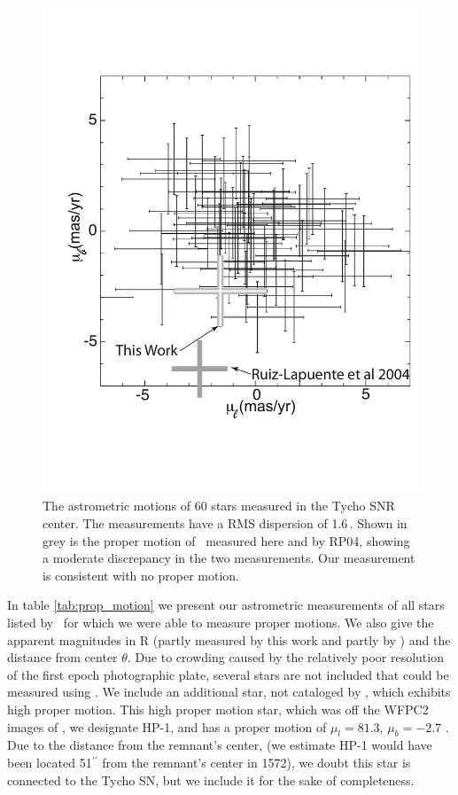 \begin{figure}[h!]
	\centering
	\includegraphics[width=\textwidth]{chapter_sn1572_starg/plots/prop_motion_compare_subaru.pdf}
\caption{The astrometric motions of 60 stars measured in the Tycho SNR
center. The measurements have a RMS dispersion of 1.6\,\masyr. Shown
in grey is the proper motion of \starg\ measured here and by RP04, showing a moderate discrepancy in the two measurements. Our measurement is consistent with no proper motion. }
\label{fig:prop_motion}
\end{figure}

In table \ref{tab:prop_motion} we present our astrometric measurements of all stars listed by \rl\  for which we were able to measure proper motions. We also give the apparent magnitudes in R (partly measured by this work and partly by \rl) and the distance from center $\theta$. Due to crowding caused by the relatively poor resolution of the first epoch photographic plate, several stars are not included that could be measured using \hst.
We include an  additional star, not cataloged by \rl, which exhibits high proper motion. This  high proper motion star, which was off the WFPC2 images of \rl,  we designate HP-1, and has a proper motion of $\mu_l=81.3$, $\mu_b=-2.7$ \masyr. Due to the distance from the remnant's center, (we estimate HP-1 would have been located 51$^{\prime\prime}$ from the remnant's center in 1572), we doubt this star is connected to the Tycho SN, but we include it for the sake of completeness. 

